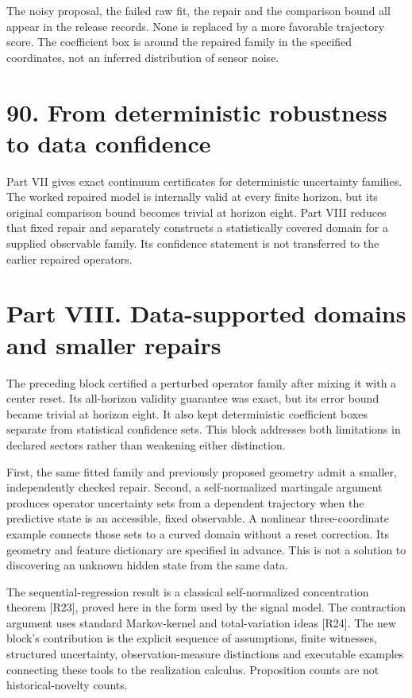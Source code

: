 \documentclass[11pt,letterpaper]{article}
\begin{document}
The noisy proposal, the failed raw fit, the repair and the comparison
bound all appear in the release records. None is replaced by a more
favorable trajectory score. The coefficient box is around the repaired
family in the specified coordinates, not an inferred distribution of
sensor noise.

\section{90. From deterministic robustness to data
confidence}\label{from-deterministic-robustness-to-data-confidence}

Part VII gives exact continuum certificates for deterministic
uncertainty families. The worked repaired model is internally valid at
every finite horizon, but its original comparison bound becomes trivial
at horizon eight. Part VIII reduces that fixed repair and separately
constructs a statistically covered domain for a supplied observable
family. Its confidence statement is not transferred to the earlier
repaired operators.

\newpage

\section{Part VIII. Data-supported domains and smaller
repairs}\label{part-viii.-data-supported-domains-and-smaller-repairs}

The preceding block certified a perturbed operator family after mixing
it with a center reset. Its all-horizon validity guarantee was exact,
but its error bound became trivial at horizon eight. It also kept
deterministic coefficient boxes separate from statistical confidence
sets. This block addresses both limitations in declared sectors rather
than weakening either distinction.

First, the same fitted family and previously proposed geometry admit a
smaller, independently checked repair. Second, a self-normalized
martingale argument produces operator uncertainty sets from a dependent
trajectory when the predictive state is an accessible, fixed observable.
A nonlinear three-coordinate example connects those sets to a curved
domain without a reset correction. Its geometry and feature dictionary
are specified in advance. This is not a solution to discovering an
unknown hidden state from the same data.

The sequential-regression result is a classical self-normalized
concentration theorem {[}R23{]}, proved here in the form used by the
signal model. The contraction argument uses standard Markov-kernel and
total-variation ideas {[}R24{]}. The new block's contribution is the
explicit sequence of assumptions, finite witnesses, structured
uncertainty, observation-measure distinctions and executable examples
connecting these tools to the realization calculus. Proposition counts
are not historical-novelty counts.
\end{document}
